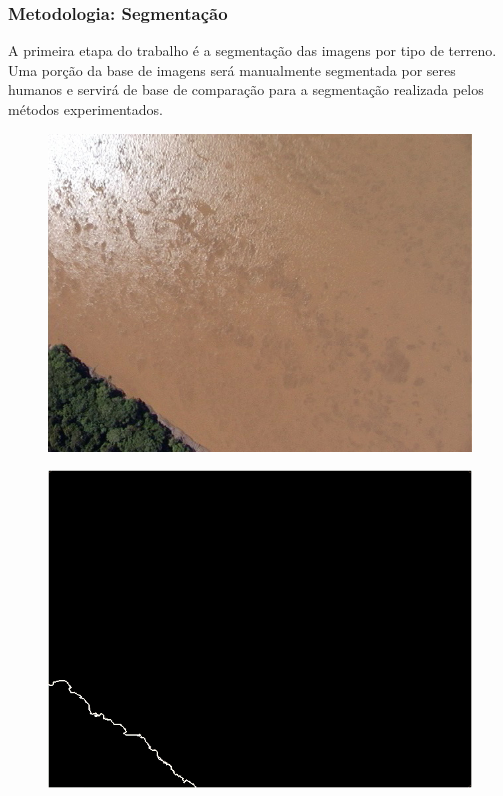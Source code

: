 \documentclass[t]{beamer}
\begin{document}
\begin{frame}
	\frametitle{Metodologia: Segmentação}

	A primeira etapa do trabalho é a segmentação das imagens por tipo de terreno. Uma porção da base de imagens será manualmente segmentada por seres humanos e servirá de base de comparação para a segmentação realizada pelos métodos experimentados.

	\begin{multicols}{2}
		\begin{figure}
			\includegraphics[scale=0.4]{imgs/exemplo_segmentacao}
		\end{figure}
		\begin{figure}
			\includegraphics[scale=0.2]{imgs/exemplo_segmentacao2}
		\end{figure}
	\end{multicols}

\end{frame}
\end{document}
